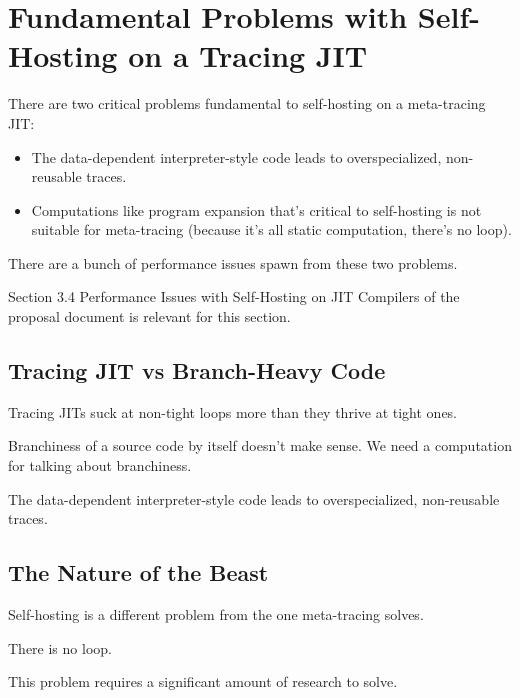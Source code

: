 \chapter{Fundamental Problems with Self-Hosting on a Tracing JIT}

	\label{chapter:problem}

	\begin{chapterpoint}
		There are two critical problems fundamental to self-hosting on a meta-tracing JIT:
		\begin{itemize}
			\item The data-dependent interpreter-style code leads to overspecialized, non-reusable traces.
			\item Computations like program expansion that's critical to self-hosting is not suitable for meta-tracing (because it's all static computation, there's no loop).
		\end{itemize}
		There are a bunch of performance issues spawn from these two problems.
	\end{chapterpoint}

	\begin{todo}[Import]
			Section 3.4 Performance Issues with Self-Hosting on JIT Compilers of the proposal document is relevant for this section.
	\end{todo}


	\section{Tracing JIT vs Branch-Heavy Code}
		\begin{mainpoint}
		 	Tracing JITs suck at non-tight loops more than they thrive at tight ones.

			Branchiness of a source code by itself doesn't make sense. We need a computation for talking about branchiness.

			The data-dependent interpreter-style code leads to overspecialized, non-reusable traces.
		\end{mainpoint}

	\section{The Nature of the Beast}
		\begin{mainpoint}
			Self-hosting is a different problem from the one meta-tracing solves.

			There is no loop.

			This problem requires a significant amount of research to solve.
		\end{mainpoint}
